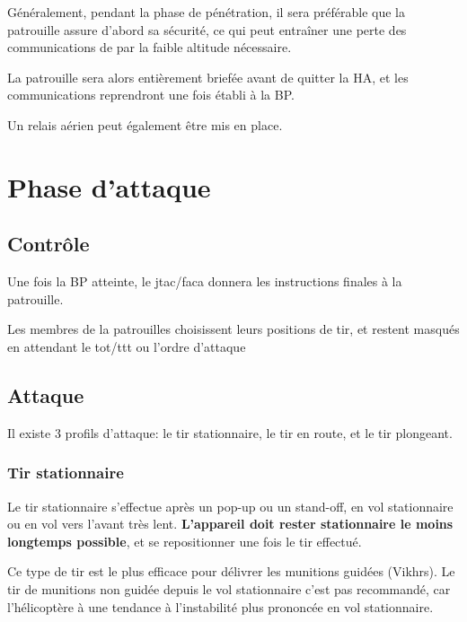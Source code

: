 \e
    \item
    Généralement, pendant la phase de pénétration, il sera préférable que la patrouille assure d’abord sa sécurité, ce qui peut entraîner une perte des communications de par la faible altitude nécessaire.
    \item La patrouille sera alors entièrement briefée avant de quitter la HA, et les communications reprendront une fois établi à la BP.
    \item Un relais aérien peut également être mis en place.
\ed

\section{Phase d’attaque}

\subsection{Contrôle}

\e
    \item Une fois la BP atteinte, le \gls{jtac}/\gls{faca} donnera les instructions finales à la patrouille.
    \item Les membres de la patrouilles choisissent leurs positions de tir, et restent masqués en attendant le \gls{tot}/\gls{ttt} ou l’ordre d’attaque
\ed

\subsection{Attaque}

\e
    \item Il existe 3 profils d’attaque: le tir stationnaire, le tir en route, et le tir plongeant.
\ed

\subsubsection{Tir stationnaire}

\e
    \item
    Le tir stationnaire s’effectue après un pop-up ou un stand-off, en vol stationnaire ou en vol vers l'avant très lent. \textbf{L’appareil doit rester stationnaire le moins longtemps possible}, et se repositionner une fois le tir effectué.
    \item
    Ce type de tir est le plus efficace pour délivrer les munitions guidées (Vikhrs). Le tir de munitions non guidée depuis le vol stationnaire c’est pas recommandé, car l’hélicoptère à une tendance à l’instabilité plus prononcée en vol stationnaire.
\ed

